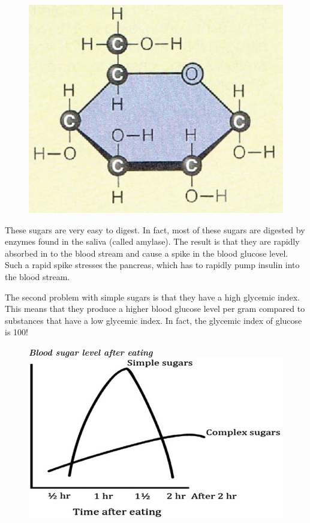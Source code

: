\begin{figure}
\centering
\includegraphics[scale=.8]{images/079.jpg}
\end{figure}

These sugars are very easy to digest. In fact, most of these sugars are digested by enzymes found in the saliva (called amylase). The result is that they are rapidly absorbed in to the blood stream and cause a spike in the blood glucose level. Such a rapid spike stresses the pancreas, which has to rapidly pump insulin into the blood stream.

The second problem with simple sugars is that they have a high glycemic index. This means that they produce a higher blood glucose level per gram compared to substances that have a low glycemic index. In fact, the glycemic index of glucose is 100!

\begin{figure}[h]
\centering
\textbf{\textit{Blood sugar level after eating}}\\
\includegraphics[scale=2]{images/080.jpg}
\end{figure}


